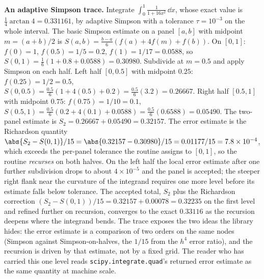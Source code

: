 \begin{example}
\textbf{An adaptive Simpson trace.} Integrate $\int_{0}^{1} \frac{1}{1 +
16 x^{2}}\, \dd x$, whose exact value is $\tfrac{1}{4}\arctan 4 =
0.331161$, by adaptive Simpson with a tolerance $\tau = 10^{-3}$ on the
whole interval. The basic Simpson estimate on a panel $[a, b]$ with
midpoint $m = (a+b)/2$ is $S(a,b) = \frac{b-a}{6}(f(a) + 4 f(m) + f(b))$.
On $[0, 1]$: $f(0) = 1$, $f(0.5) = 1/5 = 0.2$, $f(1) = 1/17 = 0.0588$, so
$S(0, 1) = \frac{1}{6}(1 + 0.8 + 0.0588) = 0.30980$. Subdivide at $m =
0.5$ and apply Simpson on each half. Left half $[0, 0.5]$ with midpoint
$0.25$: $f(0.25) = 1/2 = 0.5$, $S(0, 0.5) = \frac{0.5}{6}(1 + 4(0.5) +
0.2) = \frac{0.5}{6}(3.2) = 0.26667$. Right half $[0.5, 1]$ with midpoint
$0.75$: $f(0.75) = 1/10 = 0.1$, $S(0.5, 1) = \frac{0.5}{6}(0.2 + 4(0.1) +
0.0588) = \frac{0.5}{6}(0.6588) = 0.05490$. The two-panel estimate is
$S_{2} = 0.26667 + 0.05490 = 0.32157$. The error estimate is the Richardson
quantity $\abs{S_{2} - S(0,1)}/15 = \abs{0.32157 - 0.30980}/15 = 0.01177/15
= 7.8 \times 10^{-4}$, which exceeds the per-panel tolerance the routine
assigns to $[0,1]$, so the routine \emph{recurses} on both halves. On the
left half the local error estimate after one further subdivision drops to
about $4 \times 10^{-5}$ and the panel is accepted; the steeper right flank
near the curvature of the integrand requires one more level before its
estimate falls below tolerance. The accepted total, $S_{2}$ plus the
Richardson correction $(S_{2} - S(0,1))/15 = 0.32157 + 0.00078 = 0.32235$
on the first level and refined further on recursion, converges to the exact
$0.33116$ as the recursion deepens where the integrand bends. The trace
exposes the two ideas the library hides: the error estimate is a comparison
of two orders on the same nodes (Simpson against Simpson-on-halves, the
$1/15$ from the $h^{4}$ error ratio), and the recursion is driven by that
estimate, not by a fixed grid. The reader who has carried this one level
reads \texttt{scipy.integrate.quad}'s returned error estimate as the same
quantity at machine scale.
\end{example}

